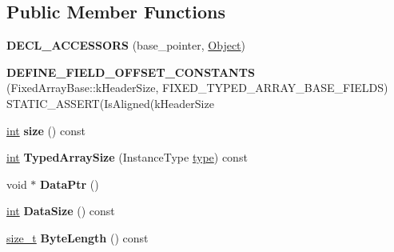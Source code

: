 \subsection*{Public Member Functions}
\begin{DoxyCompactItemize}
\item 
\mbox{\label{classv8_1_1internal_1_1FixedTypedArrayBase_a9153e55f43fac714a8180a0a6118eb01}} 
{\bfseries D\+E\+C\+L\+\_\+\+A\+C\+C\+E\+S\+S\+O\+RS} (base\+\_\+pointer, \mbox{\hyperlink{classv8_1_1internal_1_1Object}{Object}})
\item 
\mbox{\label{classv8_1_1internal_1_1FixedTypedArrayBase_a257812e13c1bbca98b82825d00c3ba17}} 
{\bfseries D\+E\+F\+I\+N\+E\+\_\+\+F\+I\+E\+L\+D\+\_\+\+O\+F\+F\+S\+E\+T\+\_\+\+C\+O\+N\+S\+T\+A\+N\+TS} (Fixed\+Array\+Base\+::k\+Header\+Size, F\+I\+X\+E\+D\+\_\+\+T\+Y\+P\+E\+D\+\_\+\+A\+R\+R\+A\+Y\+\_\+\+B\+A\+S\+E\+\_\+\+F\+I\+E\+L\+DS) S\+T\+A\+T\+I\+C\+\_\+\+A\+S\+S\+E\+RT(Is\+Aligned(k\+Header\+Size
\item 
\mbox{\label{classv8_1_1internal_1_1FixedTypedArrayBase_a4f4bed6e2974d799f66182158d8836bf}} 
\mbox{\hyperlink{classint}{int}} {\bfseries size} () const
\item 
\mbox{\label{classv8_1_1internal_1_1FixedTypedArrayBase_aaefbb5b362b044f9af66a39b1c92ad16}} 
\mbox{\hyperlink{classint}{int}} {\bfseries Typed\+Array\+Size} (Instance\+Type \mbox{\hyperlink{classstd_1_1conditional_1_1type}{type}}) const
\item 
\mbox{\label{classv8_1_1internal_1_1FixedTypedArrayBase_aee400ef42723b06367f5daf53bbcf89e}} 
void $\ast$ {\bfseries Data\+Ptr} ()
\item 
\mbox{\label{classv8_1_1internal_1_1FixedTypedArrayBase_a844be903536410ac43d6b6e95098edf2}} 
\mbox{\hyperlink{classint}{int}} {\bfseries Data\+Size} () const
\item 
\mbox{\label{classv8_1_1internal_1_1FixedTypedArrayBase_a9c6ca6d91be785f2a04334d9b1304c74}} 
\mbox{\hyperlink{classsize__t}{size\+\_\+t}} {\bfseries Byte\+Length} () const
\end{DoxyCompactItemize}
